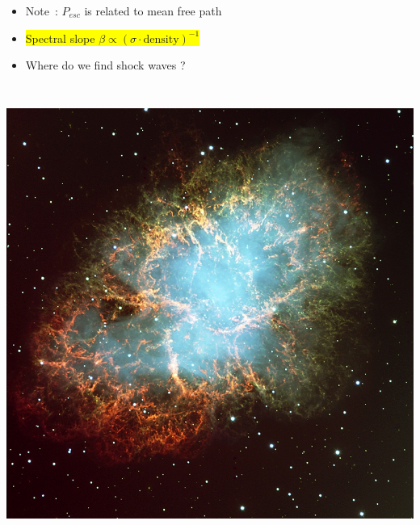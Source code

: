 \begin{itemize}
\item[] Note~: $P_{esc}$ is related to mean free path
\item[] \colorbox{yellow}{Spectral slope $\beta \propto (\sigma \cdot \text{density})^{-1}$}
\item[] {\blue Where do we find shock waves ?}
\end{itemize}

\Tr
\onecolumn
\begin{center}
\includegraphics[keepaspectratio,height=15cm]{crab}
\end{center}

